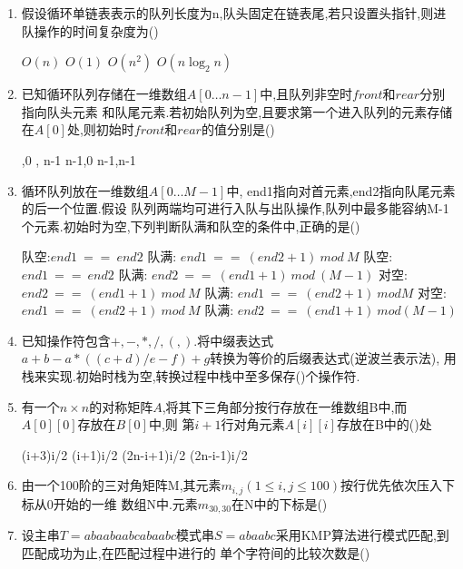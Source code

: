 \documentclass[12pt, a4paper, oneside, UTF8]{ctexbook}
\begin{document}
\begin{enumerate}
    \item 假设循环单链表表示的队列长度为n,队头固定在链表尾,若只设置头指针,则进队操作的时间复杂度为() 
    \begin{choices}
        \task $O(n) $ \task $O(1)$ \task $O(n^2)$ \task $O(n\log_{2}{n})$
    \end{choices}


    \item \bl 已知循环队列存储在一维数组$A[0\ldots n-1]$中,且队列非空时$front$和$rear$分别指向队头元素
    和队尾元素.若初始队列为空,且要求第一个进入队列的元素存储在$A[0]$处,则初始时$front$和$rear$的值分别是() 
    \begin{choices}
        ,0 , n-1 \task n-1,0 \task n-1,n-1
    \end{choices}


    \item 循环队列放在一维数组$A[0\ldots M-1]$中, end1指向对首元素,end2指向队尾元素的后一个位置.假设
    队列两端均可进行入队与出队操作,队列中最多能容纳M-1个元素.初始时为空,下列判断队满和队空的条件中,正确的是() 
    \begin{choices}[1]
        \task 队空:$end1\ ==\ end2$ 队满: $end1\ ==\ (end2+1)\ mod\ M$ 
        \task 队空:$end1\ ==\ end2$ 队满: $end2\ ==\ (end1+1)\ mod\ (M-1)$
        \task 对空:$end2\ ==\ (end1+1)\ mod\ M$ 队满: $end1\ ==\ (end2+1)\ mod M$
        \task 对空:$end1\ ==\ (end2+1)\ mod\ M$ 队满: $end2\ ==\ (end1+1)\ mod (M-1)$
    \end{choices}


    \item \bl 已知操作符包含$+,-,*,/,(,)$.将中缀表达式$a+b-a*((c+d)/e-f)+g$转换为等价的后缀表达式(逆波兰表示法),
    用栈来实现.初始时栈为空,转换过程中栈中至多保存()个操作符. 



    \item \bt 有一个$n\times n$的对称矩阵$A$,将其下三角部分按行存放在一维数组B中,而$A[0][0]$存放在$B[0]$中,则
    第$i+1$行对角元素$A[i][i]$存放在B中的()处 
    \begin{choices}
        \task (i+3)i/2 
        \task (i+1)i/2
        \task (2n-i+1)i/2
        \task (2n-i-1)i/2 
    \end{choices}


    \item \bl 由一个100阶的三对角矩阵M,其元素$m_{i,j}(1\leq i, j\leq 100)$按行优先依次压入下标从0开始的一维
    数组N中.元素$m_{30,30}$在N中的下标是() 

    \item \bl 设主串$T=abaabaabcabaabc$模式串$S=abaabc$采用KMP算法进行模式匹配,到匹配成功为止,在匹配过程中进行的
    单个字符间的比较次数是()
    


\end{enumerate}
\end{document}
